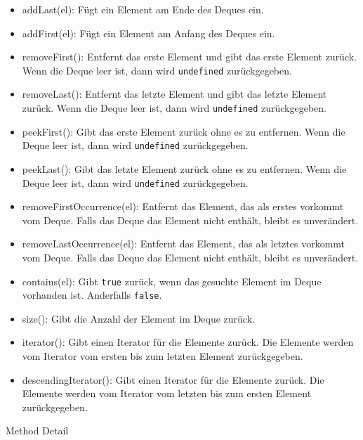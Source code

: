 \documentclass[babel]{book}
\begin{document}
\begin{itemize} 
	\item addLast(el): Fügt ein Element am Ende des Deques ein. 
	\item addFirst(el): Fügt ein Element am Anfang des Deques ein.
	\item removeFirst(): Entfernt das erste Element und gibt das erste Element zurück. Wenn die Deque leer ist, dann wird \lstinline|undefined| zurückgegeben.
	\item removeLast(): Entfernt das letzte Element und gibt das letzte Element zurück. Wenn die Deque leer ist, dann wird \lstinline|undefined| zurückgegeben.
	\item peekFirst(): Gibt das erste Element zurück ohne es zu entfernen. Wenn die Deque leer ist, dann wird \lstinline|undefined| zurückgegeben.
	\item peekLast(): Gibt das letzte Element zurück ohne es zu entfernen. Wenn die Deque leer ist, dann wird \lstinline|undefined| zurückgegeben.
	\item removeFirstOccurrence(el): Entfernt das Element, das als erstes vorkommt vom Deque. Falls das Deque das Element nicht enthält, bleibt es unverändert.
	\item removeLastOccurrence(el):  Entfernt das Element, das als letztes vorkommt vom Deque. Falls das Deque das Element nicht enthält, bleibt es unverändert.
	\item contains(el): Gibt \lstinline|true| zurück, wenn das gesuchte Element im Deque vorhanden ist. Anderfalls \lstinline|false|.
	\item size(): Gibt die Anzahl der Element im Deque zurück.
	\item iterator(): Gibt einen Iterator für die Elemente zurück. Die Elemente werden vom Iterator vom ersten bis zum letzten Element zurückgegeben.
	\item descendingIterator(): Gibt einen Iterator für die Elemente zurück. Die Elemente werden vom Iterator vom letzten bis zum ersten Element zurückgegeben.
\end{itemize}


Method Detail
\end{document}
